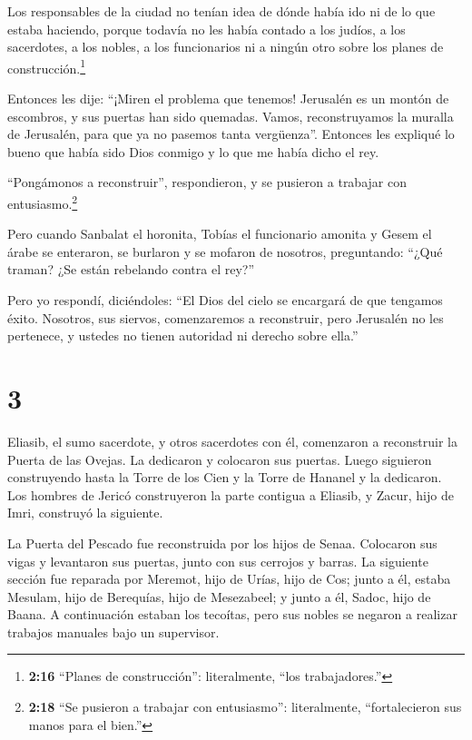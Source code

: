  Los responsables de la ciudad no tenían idea de dónde
había ido ni de lo que estaba haciendo, porque todavía no les había
contado a los judíos, a los sacerdotes, a los nobles, a los funcionarios
ni a ningún otro sobre los planes de construcción.\footnote{\textbf{2:16}
  ``Planes de construcción'': literalmente, ``los trabajadores.''}

 Entonces les dije: ``¡Miren el problema que tenemos!
Jerusalén es un montón de escombros, y sus puertas han sido quemadas.
Vamos, reconstruyamos la muralla de Jerusalén, para que ya no pasemos
tanta vergüenza''.  Entonces les expliqué lo bueno que
había sido Dios conmigo y lo que me había dicho el rey.

``Pongámonos a reconstruir'', respondieron, y se pusieron a trabajar con
entusiasmo.\footnote{\textbf{2:18} ``Se pusieron a trabajar con
  entusiasmo'': literalmente, ``fortalecieron sus manos para el bien.''}

 Pero cuando Sanbalat el horonita, Tobías el funcionario
amonita y Gesem el árabe se enteraron, se burlaron y se mofaron de
nosotros, preguntando: ``¿Qué traman? ¿Se están rebelando contra el
rey?''

 Pero yo respondí, diciéndoles: ``El Dios del cielo se
encargará de que tengamos éxito. Nosotros, sus siervos, comenzaremos a
reconstruir, pero Jerusalén no les pertenece, y ustedes no tienen
autoridad ni derecho sobre ella.''

\hypertarget{section-2}{%
\section{3}\label{section-2}}

 Eliasib, el sumo sacerdote, y otros sacerdotes con él,
comenzaron a reconstruir la Puerta de las Ovejas. La dedicaron y
colocaron sus puertas. Luego siguieron construyendo hasta la Torre de
los Cien y la Torre de Hananel y la dedicaron.  Los hombres
de Jericó construyeron la parte contigua a Eliasib, y Zacur, hijo de
Imri, construyó la siguiente.

 La Puerta del Pescado fue reconstruida por los hijos de
Senaa. Colocaron sus vigas y levantaron sus puertas, junto con sus
cerrojos y barras.  La siguiente sección fue reparada por
Meremot, hijo de Urías, hijo de Cos; junto a él, estaba Mesulam, hijo de
Berequías, hijo de Mesezabeel; y junto a él, Sadoc, hijo de Baana.
 A continuación estaban los tecoítas, pero sus nobles se
negaron a realizar trabajos manuales bajo un supervisor.

